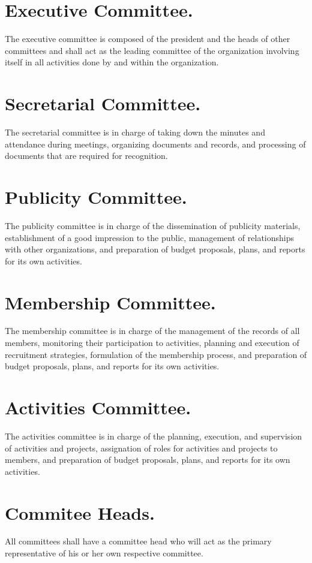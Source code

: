 \documentclass[12pt]{constitution}
\begin{document}
\section{Executive Committee.}
The executive committee is composed of
the president and the heads of other committees
and shall act as the leading committee of the organization
involving itself in all activities done by and within the organization.

\section{Secretarial Committee.}
The secretarial committee is in charge of taking down the minutes and attendance
during meetings, organizing documents and records, and processing of documents that are
required for recognition.

\section{Publicity Committee.}
The publicity committee is in charge of the dissemination of publicity materials, 
establishment of a good impression to the public,
management of relationships with other organizations,
and preparation of budget proposals, plans, and reports for its own activities.

\section{Membership Committee.}
The membership committee is in charge of
the management of the records of all members,
monitoring their participation to activities,
planning and execution of recruitment strategies,
formulation of the membership process,
and preparation of budget proposals, plans, and reports for its own activities.

\section{Activities Committee.}
The activities committee is in charge of
the planning, execution, and supervision of activities and projects,
assignation of roles for activities and projects to members,
and preparation of budget proposals, plans, and reports for its own activities.

\section{Commitee Heads.}
All committees shall have a committee head who will act as the primary 
representative of his or her own respective committee.
\end{document}
